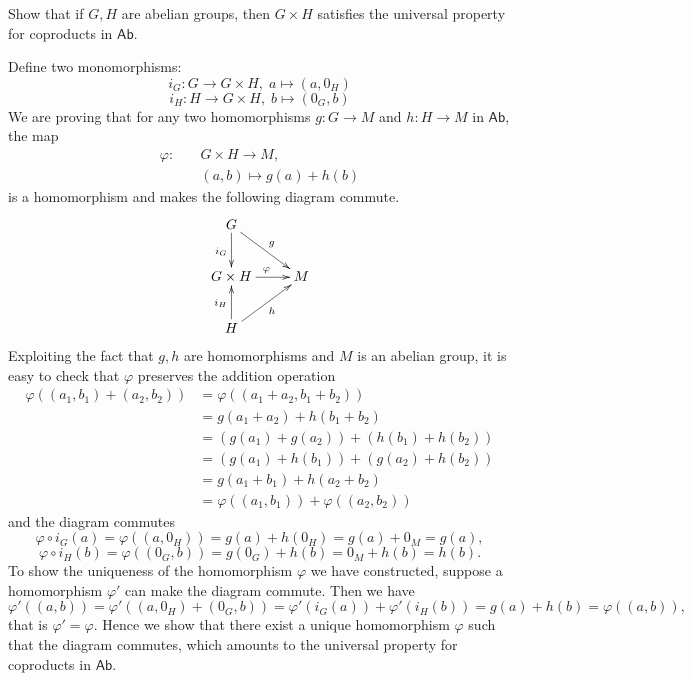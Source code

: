 \documentclass[12pt,letterpaper,boxed]{hmcpset}
\begin{document}
\begin{problem}[3.3]	
	Show that if $G, H$ are abelian groups, then $G \times H$ satisfies the universal property for coproducts in $\mathsf{Ab}$.
\end{problem}
\begin{solution}
	Define two monomorphisms:
	\[
	i_G:G\longrightarrow G\times H,\;a\longmapsto (a,0_H)
	\]
	\[
	i_H:H\longrightarrow G\times H,\;b\longmapsto (0_G,b)
	\]
	We are proving that for any two homomorphisms $g:G\rightarrow M$ and $h:H\rightarrow M$ in $\mathsf{Ab}$, the map
	\[
	\begin{aligned}
	\varphi:\quad & G\times H\longrightarrow M,\\
	         & (a,b)\longmapsto g(a)+h(b)
	\end{aligned}
    \]
    is a homomorphism and makes the following diagram commute. 
	\[\xymatrix{
		G\ar[rd]^{g}\ar[d]_{i_G}  \\
		G \times H\ar[r]^{\varphi} &  M\\
		H\ar[ru]_{h}\ar[u]^{i_H}  
	}\]
	Exploiting the fact that $g,h$ are homomorphisms and $M$ is an abelian group, it is easy to check that $\varphi$ preserves the addition operation
	\[
	\begin{aligned}
	\varphi((a_1,b_1)+(a_2,b_2))&=\varphi((a_1+a_2,b_1+b_2))\\
	&=g(a_1+a_2)+h(b_1+b_2)\\
	&=(g(a_1)+g(a_2))+(h(b_1)+h(b_2))\\
	&=(g(a_1)+h(b_1))+(g(a_2)+h(b_2))\\
	&=g(a_1+b_1)+h(a_2+b_2)\\
	&=\varphi((a_1,b_1))+\varphi((a_2,b_2))
	\end{aligned}
	\]
	and the diagram commutes
	\[
	\varphi\circ i_G(a)=\varphi((a,0_H))=g(a)+h(0_H)=g(a)+0_M=g(a),
	\]
	\[
	\varphi\circ i_H(b)=\varphi((0_G,b))=g(0_G)+h(b)=0_M+h(b)=h(b).
	\]
	To show the uniqueness of the homomorphism $\varphi$ we have constructed, suppose a homomorphism $\varphi'$ can make the diagram commute. Then we have
	\[
	\varphi'((a,b))=\varphi'((a,0_H)+(0_G,b))=\varphi'(i_G(a))+\varphi'(i_H(b))=g(a)+h(b)=\varphi((a,b)),
	\]
	that is $\varphi'=\varphi$. Hence we show that there exist a unique homomorphism $\varphi$ such that the diagram commutes, which amounts to the universal property for coproducts in $\mathsf{Ab}$.
	
\end{solution}

~\\
\end{document}
